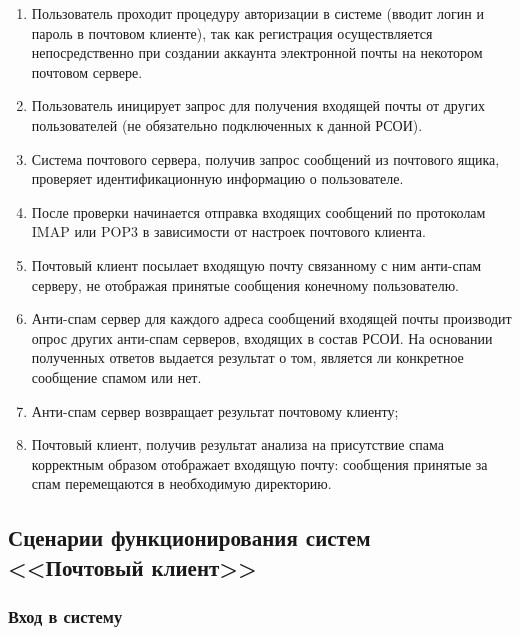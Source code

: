 \begin{enumerate}
  \item Пользователь проходит процедуру авторизации в системе (вводит логин и пароль в почтовом клиенте), так как регистрация осуществляется непосредственно при создании аккаунта электронной почты на некотором почтовом сервере.
  \item Пользователь иницирует запрос для получения входящей почты от других пользователей (не обязательно подключенных к данной РСОИ).
  \item Система почтового сервера, получив запрос сообщений из почтового ящика, проверяет идентификационную информацию о пользователе.
  \item После проверки начинается отправка входящих сообщений по протоколам IMAP или POP3 в зависимости от настроек почтового клиента.
  \item Почтовый клиент посылает входящую почту связанному с ним анти-спам серверу, не отображая принятые сообщения конечному пользователю.
  \item Анти-спам сервер для каждого адреса сообщений входящей почты производит опрос других анти-спам серверов, входящих в состав РСОИ. На основании полученных ответов выдается результат о том, является ли конкретное сообщение спамом или нет.
  \item Анти-спам сервер возвращает результат почтовому клиенту;
  \item Почтовый клиент, получив результат анализа на присутствие спама корректным образом отображает входящую почту: сообщения принятые за спам перемещаются в необходимую директорию.
\end{enumerate}

\subsection{Сценарии функционирования систем <<Почтовый клиент>>}

\subsubsection{Вход в систему}

